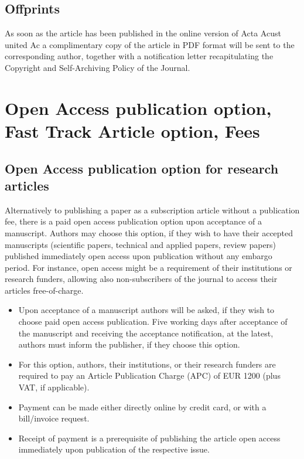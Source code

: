 \documentclass[twocolumn]{article}
\begin{document}
\subsection{Offprints}

As soon as the article has been published in the online version of Acta
Acust united Ac a complimentary copy of the article in PDF format will
be sent to the corresponding author, together with a notification letter
recapitulating the Copyright and Self-Archiving Policy of the Journal.



\section{Open Access publication option, Fast Track Article option,
Fees} \label{OA}

\subsection{Open Access publication option for research articles}

Alternatively to publishing a paper as a subscription article without a
publication fee, there is a paid open access publication option upon
acceptance of a manuscript. Authors may choose this option, if they wish
to have their accepted manuscripts (scientific papers, technical and
applied papers, review papers) published immediately open access upon
publication without any embargo period. For instance, open access might
be a requirement of their institutions or research funders, allowing
also non-subscribers of the journal to access their articles
free-of-charge.
\begin{itemize}
\item  Upon acceptance of a manuscript authors will be asked, if they
   wish to choose paid open access publication. Five working days after
   acceptance of the manuscript and receiving the acceptance
   notification, at the latest, authors must inform the publisher, if
   they choose this option.
\item  For this option, authors, their institutions, or their research
   funders are required to pay an Article Publication Charge (APC) of
   EUR 1200 (plus VAT, if applicable).
\item  Payment can be made either directly online by credit card, or with
   a bill/invoice request.
\item  Receipt of payment is a prerequisite of publishing the article
   open access immediately upon publication of the respective issue.
\end{itemize}
\end{document}

